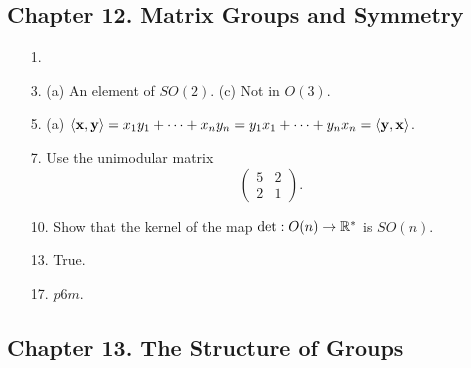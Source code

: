  
\subsection*{Chapter 12. Matrix Groups and Symmetry}
 
{\small
\begin{itemize}
 
\item[1.]
 
\item[3.]
(a) An element of $SO(2)$.
(c) Not in $O(3)$.
 
\item[5.]
(a) 
$\langle {\bold x}, {\bold y} \rangle = x_1 y_1 + \cdots + x_n y_n =
y_1 x_1 + \cdots + y_n x_n = \langle {\bold y}, {\bold x} \rangle$.
 
\item[7.]
Use the unimodular matrix 
\[
\begin{pmatrix}
5 & 2 \\
2 & 1
\end{pmatrix}.
\]
 
\item[10.]
Show that the kernel of the map $\det : O(n) \rightarrow {\Bbb R}^*$
is $SO(n)$.
 
\item[13.]
True.
 
\item[17.]
$p6m$.
 
 
 
\end{itemize}
}
 
\subsection*{Chapter 13. The Structure of Groups}
 
